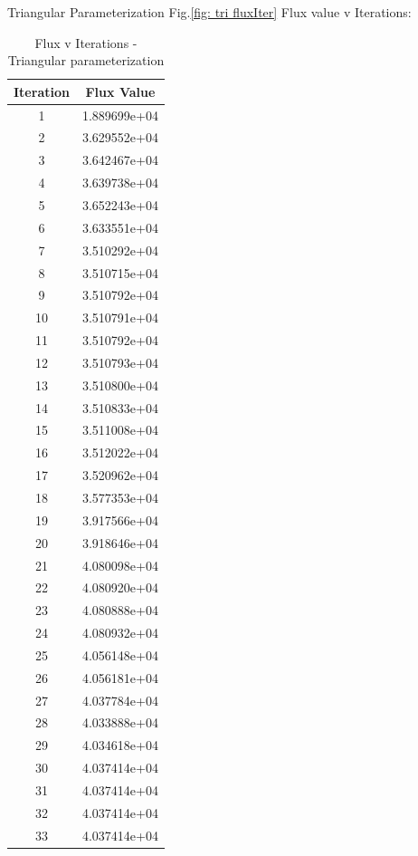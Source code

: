 \documentclass{article}
\begin{document}
\begin{appendix}
Triangular Parameterization Fig.\ref{fig: tri fluxIter} Flux value v Iterations: \\
\begin{table}[h]
\centering
\begin{tabular}{|c|c|}
\hline
Iteration & Flux Value \\
\hline
1 & 1.889699e+04 \\
2 & 3.629552e+04 \\
3 & 3.642467e+04 \\
4 & 3.639738e+04 \\
5 & 3.652243e+04\\
6 & 3.633551e+04\\
7 & 3.510292e+04\\
8 & 3.510715e+04\\
9 & 3.510792e+04\\
10 & 3.510791e+04\\
11 & 3.510792e+04\\
12 & 3.510793e+04\\
13 & 3.510800e+04\\
14 & 3.510833e+04\\
15 & 3.511008e+04\\
16 & 3.512022e+04\\
17 & 3.520962e+04\\
18 & 3.577353e+04\\
19 & 3.917566e+04\\
20 & 3.918646e+04\\
21 & 4.080098e+04\\
22 & 4.080920e+04\\
23 & 4.080888e+04\\
24 & 4.080932e+04\\
25 & 4.056148e+04\\
26 & 4.056181e+04\\
27 & 4.037784e+04\\
28 & 4.033888e+04\\
29 & 4.034618e+04\\
30 & 4.037414e+04 \\
31 & 4.037414e+04 \\
32 & 4.037414e+04 \\
33 & 4.037414e+04\\
\hline
\end{tabular}
\caption{Flux v Iterations - Triangular parameterization}
\end{table}


\end{appendix}
\end{document}
